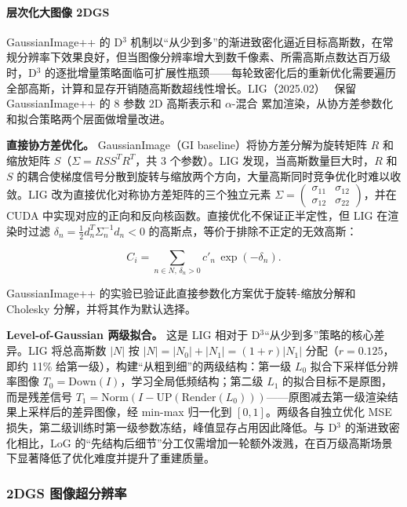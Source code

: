 \paragraph{层次化大图像 2DGS}

GaussianImage++ 的 D$^3$ 机制以``从少到多''的渐进致密化逼近目标高斯数，在常规分辨率下效果良好，但当图像分辨率增大到数千像素、所需高斯点数达百万级时，D$^3$ 的逐批增量策略面临可扩展性瓶颈——每轮致密化后的重新优化需要遍历全部高斯，计算和显存开销随高斯数超线性增长。LIG（2025.02）~\cite{2502_09039} 保留 GaussianImage++ 的 8 参数 2D 高斯表示和 $\alpha$-混合 累加渲染，从协方差参数化和拟合策略两个层面做增量改进。

\textbf{直接协方差优化。} GaussianImage（GI baseline）将协方差分解为旋转矩阵 $R$ 和缩放矩阵 $S$（$\Sigma = RSS^TR^T$，共 3 个参数）。LIG 发现，当高斯数量巨大时，$R$ 和 $S$ 的耦合使梯度信号分散到旋转与缩放两个方向，大量高斯同时竞争优化时难以收敛。LIG 改为直接优化对称协方差矩阵的三个独立元素 $\Sigma = \begin{pmatrix} \sigma_{11} & \sigma_{12} \\ \sigma_{12} & \sigma_{22} \end{pmatrix}$，并在 CUDA 中实现对应的正向和反向核函数。直接优化不保证正半定性，但 LIG 在渲染时过滤 $\delta_n = \tfrac{1}{2} d_n^T \Sigma_n^{-1} d_n < 0$ 的高斯点，等价于排除不正定的无效高斯：

\begin{equation}
C_i = \sum_{n \in N, \, \delta_n > 0} c'_n \, \exp(-\delta_n).
\end{equation}

GaussianImage++ 的实验已验证此直接参数化方案优于旋转-缩放分解和 Cholesky 分解，并将其作为默认选择。

\textbf{Level-of-Gaussian 两级拟合。} 这是 LIG 相对于 D$^3$``从少到多''策略的核心差异。LIG 将总高斯数 $|N|$ 按 $|N| = |N_0| + |N_1| = (1+r)|N_1|$ 分配（$r = 0.125$，即约 11\% 给第一级），构建``从粗到细''的两级结构：第一级 $L_0$ 拟合下采样低分辨率图像 $T_0 = \mathrm{Down}(I)$，学习全局低频结构；第二级 $L_1$ 的拟合目标不是原图，而是残差信号 $T_1 = \mathrm{Norm}(I - \mathrm{UP}(\mathrm{Render}(L_0)))$——原图减去第一级渲染结果上采样后的差异图像，经 min-max 归一化到 $[0, 1]$。两级各自独立优化 MSE 损失，第二级训练时第一级参数冻结，峰值显存占用因此降低。与 D$^3$ 的渐进致密化相比，LoG 的``先结构后细节''分工仅需增加一轮额外泼溅，在百万级高斯场景下显著降低了优化难度并提升了重建质量。

\subsubsection{2DGS 图像超分辨率}


